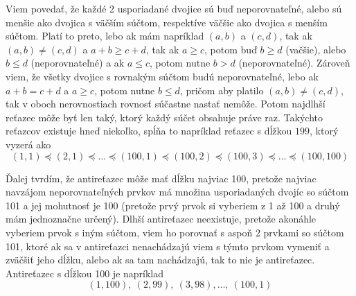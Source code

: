 
Viem povedať, že každé 2 usporiadané dvojice sú buď neporovnateľné, 
alebo sú menšie ako dvojica s väčším súčtom, respektíve väčšie ako 
dvojica s menším súčtom. Platí to preto, lebo ak mám napríklad $(a,b)$ 
a $(c,d)$, tak ak $(a,b)\neq (c,d)$ a $a+b\geq c+d$, tak ak $a\geq c$, 
potom buď $b\geq d$ (vačšie), alebo $b\leq d$ (neporovnateľné) a ak 
$a\leq c$, potom nutne $b>d$ (neporovnateľné). Zároveň viem, že všetky 
dvojice s rovnakým súčtom budú neporovnateľné, lebo ak $a+b=c+d$ a 
$a\geq c$, potom nutne $b\leq d$, pričom aby platilo $(a,b)\neq (c,d)$, 
tak v oboch nerovnostiach rovnosť súčastne nastať nemôže. Potom 
najdlhší reťazec môže byť len taký, ktorý každý súčet obsahuje práve 
raz. Takýchto reťazcov existuje hneď niekoľko, spĺňa to napríklad 
reťazec s dĺžkou $199$, ktorý vyzerá ako
$$(1,1)\preceq (2,1)\preceq\dots\preceq (100,1)
\preceq (100,2)\preceq (100,3)\preceq\dots\preceq (100,100)$$

Ďalej tvrdím, že antireťazec môže mať dĺžku najviac 100, pretože 
najviac navzájom neporovnateľných prvkov má množina usporiadaných 
dvojíc so súčtom 101 a jej mohutnosť je 100 (pretože prvý prvok si 
vyberiem z 1 až 100 a druhý mám jednoznačne určený). Dlhší antireťazec 
neexistuje, pretože akonáhle vyberiem prvok s iným súčtom, viem ho 
porovnať s aspoň 2 prvkami so súčtom 101, ktoré ak sa v antireťazci 
nenachádzajú viem s týmto prvkom vymeniť a zväčšiť jeho dĺžku, alebo 
ak sa tam nachádzajú, tak to nie je antireťazec. Antireťazec s dĺžkou 
100 je napríklad 
$$(1,100),\ (2,99),\ (3,98),\dots,\ (100,1)$$


